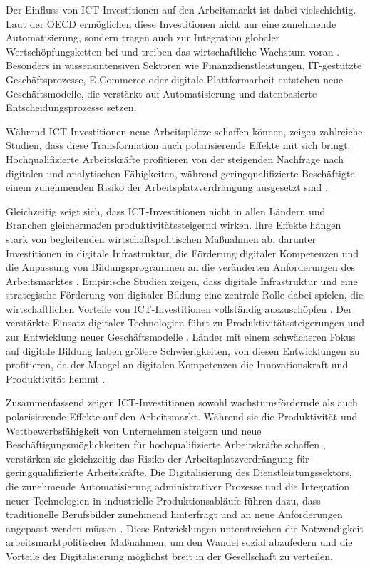 Der Einfluss von \ac{ICT}-Investitionen auf den Arbeitsmarkt ist dabei vielschichtig. Laut 
der \ac{OECD} ermöglichen diese Investitionen nicht nur eine zunehmende Automatisierung, 
sondern tragen auch zur Integration globaler Wertschöpfungsketten bei und treiben das 
wirtschaftliche Wachstum voran \parencite[vgl.][S. 144]{oecd2019measuring}. Besonders 
in wissensintensiven Sektoren wie Finanzdienstleistungen, \ac{IT}-gestützte 
Geschäftsprozesse, E-Commerce oder digitale Plattformarbeit entstehen neue 
Geschäftsmodelle, die verstärkt auf Automatisierung und datenbasierte Entscheidungsprozesse 
setzen.

Während \ac{ICT}-Investitionen neue Arbeitsplätze schaffen können, zeigen zahlreiche 
Studien, dass diese Transformation auch polarisierende Effekte mit sich bringt. 
Hochqualifizierte Arbeitskräfte profitieren von der steigenden Nachfrage nach digitalen 
und analytischen Fähigkeiten, während geringqualifizierte Beschäftigte einem zunehmenden 
Risiko der Arbeitsplatzverdrängung ausgesetzt sind 
\parencite[vgl.][Kap. 2]{brynjolfsson2014thesecond}.

Gleichzeitig zeigt sich, dass \ac{ICT}-Investitionen nicht in allen Ländern und Branchen 
gleichermaßen produktivitätssteigernd wirken. Ihre Effekte hängen stark von begleitenden 
wirtschaftspolitischen Maßnahmen ab, darunter Investitionen in digitale Infrastruktur, 
die Förderung digitaler Kompetenzen und die Anpassung von Bildungsprogrammen an die 
veränderten Anforderungen des Arbeitsmarktes 
\parencite[vgl.][Kap. 13]{brynjolfsson2014thesecond}. Empirische 
Studien zeigen, dass digitale Infrastruktur und eine strategische Förderung von digitaler 
Bildung eine zentrale Rolle dabei spielen, die wirtschaftlichen Vorteile von 
\ac{ICT}-Investitionen vollständig auszuschöpfen \parencite[vgl.][S. 357–358]{vu2011ict}. Der 
verstärkte Einsatz digitaler Technologien führt zu Produktivitätssteigerungen und
zur Entwicklung neuer Geschäftsmodelle \parencite[vgl.][S. 361-362]{vu2011ict}. 
Länder mit einem schwächeren Fokus auf digitale Bildung haben größere Schwierigkeiten, 
von diesen Entwicklungen zu profitieren, da der Mangel an digitalen Kompetenzen die 
Innovationskraft und Produktivität hemmt \parencite[vgl.][S. 19]{oecd2020digital}.

Zusammenfassend zeigen \ac{ICT}-Investitionen sowohl wachstumsfördernde als auch 
polarisierende Effekte auf den Arbeitsmarkt. Während sie die Produktivität und 
Wettbewerbsfähigkeit von Unternehmen steigern und neue Beschäftigungsmöglichkeiten für 
hochqualifizierte Arbeitskräfte schaffen \parencite[vgl.][S. 19–20]{oecd2020digital}, 
verstärken sie gleichzeitig das Risiko der Arbeitsplatzverdrängung für geringqualifizierte 
Arbeitskräfte. Die Digitalisierung des Dienstleistungssektors, die zunehmende Automatisierung 
administrativer Prozesse und die Integration neuer Technologien in industrielle 
Produktionsabläufe führen dazu, dass traditionelle Berufsbilder zunehmend hinterfragt und 
an neue Anforderungen angepasst werden müssen \parencite[vgl.][S. 20]{oecd2020digital}. Diese 
Entwicklungen unterstreichen die Notwendigkeit arbeitsmarktpolitischer Maßnahmen, um den 
Wandel sozial abzufedern und die Vorteile der Digitalisierung möglichst breit in der 
Gesellschaft zu verteilen.

